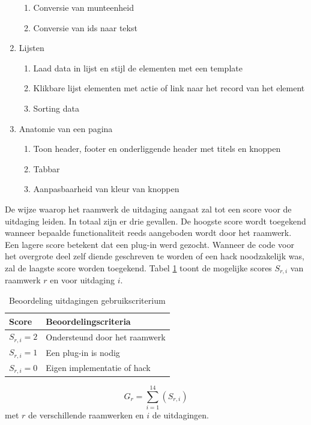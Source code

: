 \begin{enumerate}[label*=U \arabic*.]
\begin{enumerate}[label*=\arabic*]
\item Conversie van munteenheid
\item Conversie van ids naar tekst	
\end{enumerate}
\item \label{challenge:lijsten}Lijsten
\begin{enumerate}[label*=\arabic*]
\item Laad data in lijst en stijl de elementen met een template
\item Klikbare lijst elementen met actie of link naar het record van het element
\item Sorting data
\end{enumerate}
\item \label{challenge:anatomie}Anatomie van een pagina
\begin{enumerate}[label*=\arabic*]
 \item Toon header,  footer en onderliggende header met titels en knoppen
 \item Tabbar
 \item Aanpasbaarheid van kleur van knoppen
 \end{enumerate}
\end{enumerate} 

De wijze waarop het raamwerk de uitdaging aangaat zal tot een score voor de uitdaging leiden.
In totaal zijn er drie gevallen.
De hoogste score wordt toegekend wanneer bepaalde functionaliteit reeds aangeboden wordt door het raamwerk. 
Een lagere score betekent dat een plug-in werd gezocht. 
Wanneer de code voor het overgrote deel zelf diende geschreven te worden of een hack noodzakelijk was, zal de laagste score worden toegekend.
Tabel \ref{tabel:scores-uitdagingen} toont de mogelijke scores $S_{r,i}$ van raamwerk $r$ en voor uitdaging $i$.
\begin{table}[h]	
  \centering
  \begin{tabular}{ll}
    \toprule
    \textbf{Score} & \textbf{Beoordelingscriteria}\\
    \midrule
    $S_{r,i} = 2$ & Ondersteund door het raamwerk\\
    $S_{r,i} = 1$ & Een plug-in is nodig\\
    $S_{r,i} = 0$ & Eigen implementatie of hack\\
    \bottomrule
  \end{tabular}
  \caption{Beoordeling uitdagingen gebruikscriterium}
  \label{tabel:scores-uitdagingen}
\end{table}
\begin{equation}
  G_r = \sum_{i=1}^{14}{\left(S_{r,i}\right)}
  \label{eq:gebruik}
\end{equation}
met $r$ de verschillende raamwerken en $i$ de uitdagingen.

